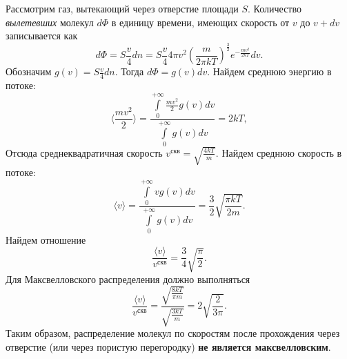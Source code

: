 \documentclass[a4paper]{article}
\title{}
\author{С.~Е.~Володин, 272 гр.}
\date{}
\begin{document}
\maketitle
Рассмотрим газ, вытекающий через отверстие площади $S$. Количество {\em вылетевших} молекул $d\Phi$ в единицу времени, имеющих скорость от $v$ до $v+dv$ записывается как
$$
d\Phi=S\frac{v}{4}dn=S\frac{v}{4}4\pi v^2 \left(\frac{m}{2\pi k T}\right)^\frac{3}{2}e^{-\frac{mv^2}{2 k T}}dv.
$$
Обозначим $g(v)=S\frac{v}{4}dn$. Тогда $d\Phi=g(v)dv.$\newline
Найдем среднюю энергию в потоке:
$$
\langle\frac{mv^2}{2}\rangle=\frac{\int\limits_{0}^{+\infty} \frac{mv^2}{2}g(v)dv}{\int\limits_{0}^{+\infty} g(v)dv}=2kT,
$$
Отсюда среднеквадратичная скорость $v^{\text{скв}}=\sqrt{\frac{4kT}{m}}$.\newline
Найдем среднюю скорость в потоке:
$$
\langle v\rangle=\frac{\int\limits_{0}^{+\infty} vg(v)dv}{\int\limits_{0}^{+\infty} g(v)dv}=\frac{3}{2}\sqrt{\frac{\pi k T}{2 m}}.
$$
Найдем отношение
$$
\frac{\langle v\rangle}{v^{\text{скв}}}=\frac{3}{4}\sqrt{\frac{\pi}{2}}.
$$
Для Максвелловского распределения должно выполняться
$$
\frac{\langle v\rangle}{v^{\text{скв}}}=\frac{\sqrt{\frac{8kT}{\pi m}}}{\sqrt{\frac{3kT}{m}}}=2\sqrt{\frac{2}{3 \pi}}.
$$
Таким образом, распределение молекул по скоростям после прохождения через отверстие (или через пористую перегородку) \textbf{не является максвелловским}.
\end{document}
